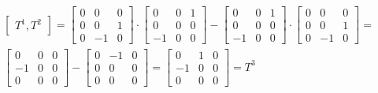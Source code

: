 \begin{gather*}
\begin{bmatrix}
T^1 , T^2
\end{bmatrix} =
\begin{bmatrix} 0 & 0 & 0 \\
 0 & 0 & 1 \\
  0 & -1 & 0 
  \end{bmatrix}
  \cdot
  \begin{bmatrix} 0 & 0 & 1 \\
 0 & 0 & 0 \\
  -1 & 0 & 0 
  \end{bmatrix}
  -
  \begin{bmatrix} 0 & 0 & 1 \\
 0 & 0 & 0 \\
  -1 & 0 & 0 
  \end{bmatrix}
  \cdot
  \begin{bmatrix} 0 & 0 & 0 \\
 0 & 0 & 1 \\
  0 & -1 & 0 
  \end{bmatrix} =\\
  \begin{bmatrix} 0 & 0 & 0 \\
 -1 & 0 & 0 \\
  0 & 0 & 0 
  \end{bmatrix} -
  \begin{bmatrix} 0 & -1 & 0 \\
 0 & 0 & 0 \\
  0 & 0 & 0 
  \end{bmatrix} = 
  \begin{bmatrix} 0 & 1 & 0 \\
 -1 & 0 & 0 \\
  0 & 0 & 0 
  \end{bmatrix} =T^3
\end{gather*}

